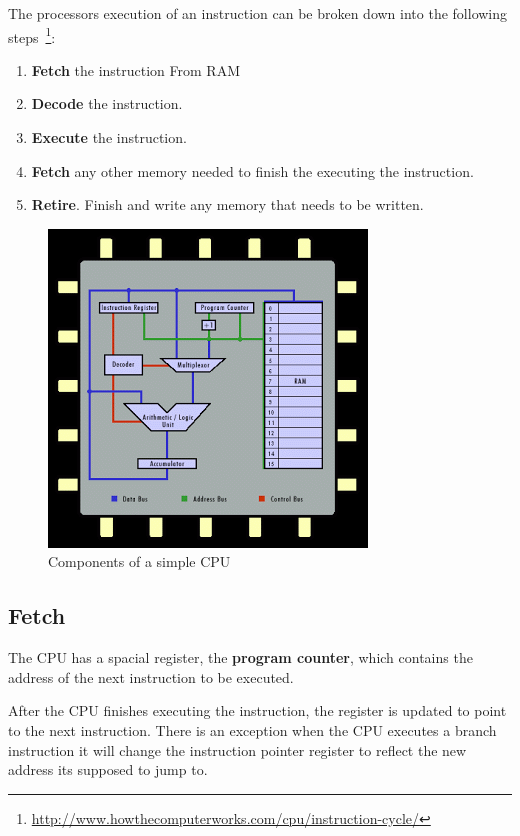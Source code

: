 
The processors execution of an instruction can be broken down into the following steps~\footnote{\url{http://www.howthecomputerworks.com/cpu/instruction-cycle/}}:
\begin{enumerate}
\item \textbf{Fetch} the instruction From RAM
\item \textbf{Decode} the instruction.
\item \textbf{Execute} the instruction.
\item \textbf{Fetch} any other memory needed to finish the executing the instruction.
\item \textbf{Retire}. Finish and write any memory that needs to be written.
\end{enumerate}

\begin{figure}[H]
  \centering
  \includegraphics[scale=0.5]{images/cpu}
  \caption{Components of a simple CPU}
\end{figure}

\subsection{Fetch}
The CPU has a spacial register, the \textbf{program counter}, which contains the address of the next instruction to be executed.

After the CPU finishes executing the instruction, the register is updated to point to the next instruction. There is an exception when the CPU executes a branch instruction it will change the instruction pointer register to reflect the new address its supposed to jump to.

